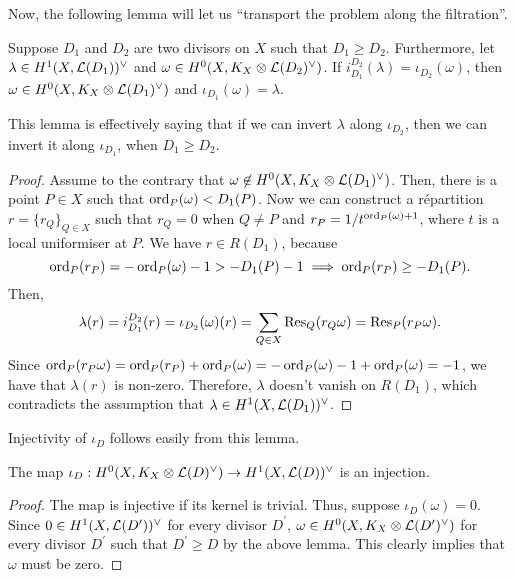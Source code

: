Now, the following lemma will let us ``transport the problem along the
filtration''.
\begin{lemm}\label{lemm:invert_inclusion}
  Suppose $D_{1}$ and $D_{2}$ are two divisors on $X$ such that
  $D_{1}\geq D_{2}$. Furthermore, let $\lambda\in H^1(X,\mathcal{L}(D_{1}))^{\vee}$ and
  $\omega\in H^0(X,K_X\otimes\mathcal{L}(D_{2})^{\vee})$. If $i_{D_{1}}^{D_{2}}(\lambda)
  =\iota_{D_{2}}(\omega)$, then $\omega\in H^0(X,K_X\otimes\mathcal{L}(D_{1})^{\vee})$ and
  $\iota_{D_{1}}(\omega)=\lambda$.
\end{lemm}
This lemma is effectively saying that if we can invert $\lambda$
along $\iota_{D_{2}}$, then we can invert it along $\iota_{D_{1}}$, when
$D_{1}\geq D_{2}$.
\begin{proof}
  Assume to the contrary that $\omega\not\in H^0(X,K_X\otimes\mathcal{L}(D_{1})^{\vee})$. Then,
  there is a point $P\in X$ such that $\operatorname{ord}_{P}(\omega)<D_{1}(P)$.
  Now we can construct a r\'epartition $r=\{r_{Q}\}_{Q\in X}$ such that
  $r_{Q}=0$ when $Q\neq P$ and $r_{P}=1/t^{\operatorname{ord}_{P}(\omega)+1}$, where $t$ is a
  local uniformiser at $P$. We have $r\in R(D_{1})$, because
  \[
    \operatorname{ord}_{P}(r_{P})=-\operatorname{ord}_{P}(\omega)-1>-D_{1}(P)-1
    \implies \operatorname{ord}_{P}(r_{P})\geq -D_{1}(P).
  \]
  Then,
  \[
    \lambda(r)=i_{D_{1}}^{D_{2}}(r)=\iota_{D_{2}}(\omega)(r)
    =\sum_{Q\in X}\operatorname{Res}_{Q}(r_{Q}\omega)=\operatorname{Res}_{P}(r_{P}\omega).
  \]
  Since $\operatorname{ord}_{P}(r_{P}\omega)=\operatorname{ord}_{P}(r_{P})+\operatorname{ord}_{P}(\omega)
  =-\operatorname{ord}_{P}(\omega)-1+\operatorname{ord}_{P}(\omega)=-1$, we have that $\lambda(r)$ is
  non-zero. Therefore, $\lambda$ doesn't vanish on $R(D_{1})$, which
  contradicts the assumption that $\lambda\in H^1(X,\mathcal{L}(D_{1}))^{\vee}$.
\end{proof}
Injectivity of $\iota_{D}$ follows easily from this lemma.
\begin{prop}\label{prop:injectivity}
  The map $\iota_{D}:H^0(X,K_X\otimes\mathcal{L}(D)^{\vee})\to H^1(X,\mathcal{L}(D))^{\vee}$ is an injection.
\end{prop}
\begin{proof}
  The map is injective if its kernel is trivial. Thus, suppose
  $\iota_{D}(\omega)=0$. Since $0\in H^1(X,\mathcal{L}(D^{\prime}))^{\vee}$ for every divisor
  $D^{\prime}$, $\omega\in H^0(X,K_X\otimes\mathcal{L}(D^{\prime})^{\vee})$ for every divisor $D^{\prime}$
  such that $D^{\prime}\geq D$ by the above lemma. This clearly implies that
  $\omega$ must be zero.
\end{proof}

